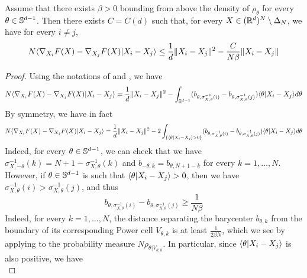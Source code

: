 \begin{lemma} \label{lemma:gradient_diff_bound}
    Assume that there exists $\beta > 0$ bounding from above the density of $\rho_\theta$ for every $\theta \in \mathbb S^{d-1}$. Then there exists $C = C(d)$ such that, for every $X \in (\mathbb R^d)^N \setminus \Delta_N$, we have for every $i \neq j$,
    \begin{equation} \label{eq:lemma_grad_diff_bound}
        N\langle\nabla_{X_i}F(X) - \nabla_{X_j}F(X)|X_i - X_j\rangle \leq \frac{1}{d} \|X_i - X_j\|^2 - \frac{C}{N\beta}\|X_i - X_j\|
    \end{equation}
\end{lemma}

\begin{proof}
    Using the notations of  and , we have
    \begin{equation}
        N\langle\nabla_{X_i}F(X) - \nabla_{X_j}F(X)|X_i - X_j\rangle = \frac{1}{d} \|X_i - X_j\|^2 - \int_{\mathbb S^{d-1}} (b_{\theta,\sigma^{-1}_{X,\theta}(i)} - b_{\theta,\sigma^{-1}_{X,\theta}(j)})\langle\theta|X_i - X_j\rangle d\theta
    \end{equation}
    By symmetry, we have in fact
    \begin{equation} \label{eq:appendix_l183}
        N\langle\nabla_{X_i}F(X) - \nabla_{X_j}F(X)|X_i - X_j\rangle = \frac{1}{d} \|X_i - X_j\|^2 - 2\int_{\{\langle\theta|X_i - X_j\rangle > 0\}} (b_{\theta,\sigma^{-1}_{X,\theta}(i)} - b_{\theta,\sigma^{-1}_{X,\theta}(j)})\langle\theta|X_i - X_j\rangle d\theta
    \end{equation}
    Indeed, for every $\theta \in \mathbb S^{d-1}$, we can check that we have $\sigma_{X,-\theta}^{-1}(k) = N + 1 - \sigma_{X,\theta}^{-1}(k)$ and $b_{-\theta,k} = b_{\theta,N+1-k}$ for every $k = 1,\ldots,N$. However, if $\theta \in \mathbb S^{d-1}$ is such that $\langle\theta|X_i - X_j\rangle > 0$, then we have $\sigma^{-1}_{X,\theta}(i) > \sigma^{-1}_{X,\theta}(j)$, and thus
    \begin{equation}
        b_{\theta,\sigma^{-1}_{X,\theta}(i)} - b_{\theta,\sigma^{-1}_{X,\theta}(j)} \geq \frac{1}{N \beta}
    \end{equation}
    Indeed, for every $k = 1,\ldots,N$, the distance separating the barycenter $b_{\theta,k}$ from the boundary of its corresponding Power cell $V_{\theta,k}$ is at least $\frac{1}{2\beta N}$, which we see by applying  to the probability measure $N \rho_{\theta|V_{\theta,k}}$. In particular, since $\langle\theta|X_i - X_j\rangle$ is also positive, we have
    \begin{equation}

\end{equation}
\end{proof}
